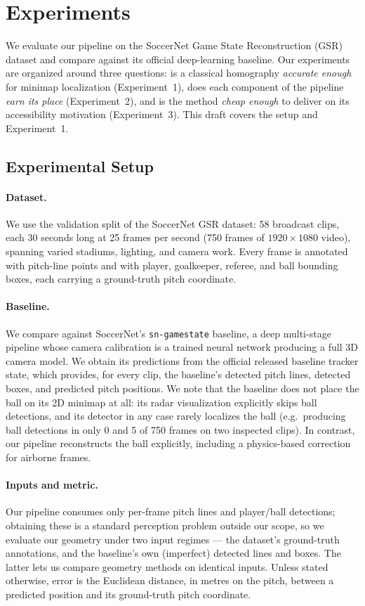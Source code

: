 \documentclass{article}
\begin{document}
\section{Experiments}

We evaluate our pipeline on the SoccerNet Game State Reconstruction (GSR)
dataset and compare against its official deep-learning baseline. Our
experiments are organized around three questions: is a classical homography
\emph{accurate enough} for minimap localization (Experiment~1), does each
component of the pipeline \emph{earn its place} (Experiment~2), and is the
method \emph{cheap enough} to deliver on its accessibility motivation
(Experiment~3). This draft covers the setup and Experiment~1.

\subsection{Experimental Setup}

\paragraph{Dataset.}
We use the validation split of the SoccerNet GSR dataset: 58 broadcast clips,
each 30 seconds long at 25 frames per second (750 frames of
$1920\times1080$ video), spanning varied stadiums, lighting, and camera work.
Every frame is annotated with pitch-line points and with player, goalkeeper,
referee, and ball bounding boxes, each carrying a ground-truth pitch
coordinate.

\paragraph{Baseline.}
We compare against SoccerNet's \texttt{sn-gamestate} baseline, a deep
multi-stage pipeline whose camera calibration is a trained neural network
producing a full 3D camera model. We obtain its predictions from the official
released baseline tracker state, which provides, for every clip, the
baseline's detected pitch lines, detected boxes, and predicted pitch
positions. We note that the baseline does not place the ball on its 2D
minimap at all: its radar visualization explicitly skips ball detections, and
its detector in any case rarely localizes the ball (e.g.\ producing ball
detections in only 0 and 5 of 750 frames on two inspected clips). In contrast,
our pipeline reconstructs the ball explicitly, including a physics-based
correction for airborne frames.

\paragraph{Inputs and metric.}
Our pipeline consumes only per-frame pitch lines and player/ball detections;
obtaining these is a standard perception problem outside our scope, so we
evaluate our geometry under two input regimes --- the dataset's ground-truth
annotations, and the baseline's own (imperfect) detected lines and boxes. The
latter lets us compare geometry methods on identical inputs. Unless stated
otherwise, error is the Euclidean distance, in metres on the pitch, between a
predicted position and its ground-truth pitch coordinate.
\end{document}
